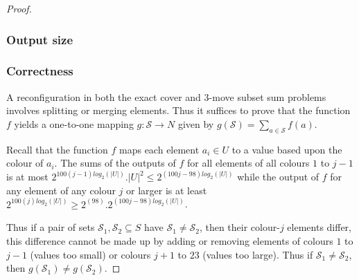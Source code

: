 \begin{proof}
\subsubsection{Output size}



\subsubsection{Correctness}
A reconﬁguration in both the exact cover and $3$-move subset sum problems involves splitting
or merging elements. Thus it suffices to prove that the function $f$ yields a one-to-one mapping $g : \mathcal{S} \rightarrow N$
given by $g(\mathcal{S}) = \sum_{a \in \mathcal{S}}^{} f(a)$.

Recall that the function $f$ maps each element $a_i \in U$ to a value based upon the colour of $a_i$. The sums of
the outputs of $f$ for all elements of all colours $1$ to $j-1$ is at most $2^{100(j-1) log_{2}(|U|)}.|U|^{2} \leq 2^{(100j-98)log_{2}(|U|)}$
while the output of $f$ for any element of any colour $j$ or larger is at least $2^{100(j) log_{2}(|U|)} \geq 2^{(98)}.2^{(100j-98)log_{2}(|U|)}$.

Thus if a pair of sets $\mathcal{S}_1, \mathcal{S}_2 \subseteq S$ have $\mathcal{S}_1 \neq \mathcal{S}_2$, then their colour-$j$ elements
differ, this difference cannot be made up by adding or removing elements of colours $1$ to $j-1$ (values too small) or colours $j + 1$ to $23$
(values too large). Thus if $\mathcal{S}_1 \neq \mathcal{S}_2$, then $g(\mathcal{S}_1) \neq g(\mathcal{S}_2)$.
\end{proof}

